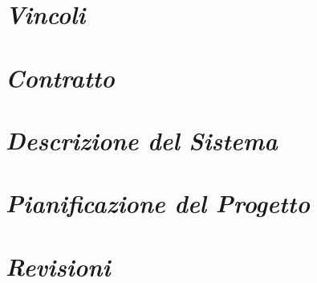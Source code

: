\documentclass{article}
\begin{document}
\section{\itshape{Vincoli}}



\section{\itshape{Contratto}}


\section{\itshape{Descrizione del Sistema}}


\section{\itshape{Pianificazione del Progetto}}



\section{\itshape{Revisioni}}

\end{document}

